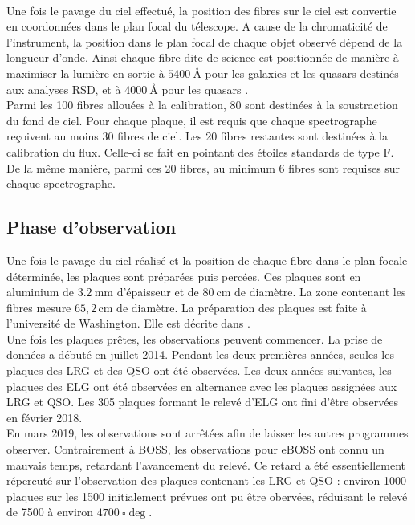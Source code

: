 \paragraph{} Une fois le pavage du ciel effectué, la position des fibres sur le ciel est convertie en coordonnées dans le plan focal du télescope. A cause de la chromaticité de l'instrument, la position dans le plan focal de chaque objet observé dépend de la longueur d'onde. Ainsi chaque fibre dite de science est positionnée de manière à maximiser la lumière en sortie à $\SI{5400}{\angstrom}$ pour les galaxies et les quasars destinés aux analyses RSD, et à $\SI{4000}{\angstrom}$ pour les quasars \lya{}. \\
Parmi les \num{100} fibres allouées à la calibration, \num{80} sont destinées à la soustraction du fond de ciel. Pour chaque plaque, il est requis que chaque spectrographe reçoivent au moins \num{30} fibres de ciel. Les \num{20} fibres restantes sont destinées à la calibration du flux. Celle-ci se fait en pointant des étoiles standards de type F. De la même manière, parmi ces \num{20} fibres, au minimum \num{6} fibres sont requises sur chaque spectrographe.


\subsection{Phase d'observation}

Une fois le pavage du ciel réalisé et la position de chaque fibre dans le plan focale déterminée, les plaques sont préparées puis percées. Ces plaques sont en aluminium de $\SI{3,2}{\milli\meter}$ d'épaisseur et de $\SI{80}{\centi\meter}$ de diamètre. La zone contenant les fibres mesure $65,2\,\mathrm{cm}$ de diamètre. La préparation des plaques est faite à l'université de Washington. Elle est décrite dans \textcite{Blanton2017}.\\
Une fois les plaques prêtes, les observations peuvent commencer. La prise de données a débuté en juillet 2014. Pendant les deux premières années, seules les plaques des LRG et des QSO ont été observées. Les deux années suivantes, les plaques des ELG ont été observées en alternance avec les plaques assignées aux LRG et QSO. Les \num{305} plaques formant le relevé d'ELG ont fini d'être observées en février 2018. \\
En mars 2019, les observations sont arrêtées afin de laisser les autres programmes observer. Contrairement à BOSS, les observations pour eBOSS ont connu un mauvais temps, retardant l'avancement du relevé. Ce retard a été essentiellement répercuté sur l'observation des plaques contenant les LRG et QSO : environ \num{1000} plaques sur les \num{1500} initialement prévues ont pu être obervées, réduisant le relevé de \num{7500} à environ $\SI{4700}{\square\deg}$.


